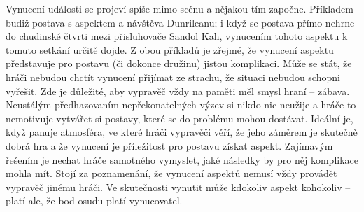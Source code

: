 \documentclass[../main.tex]{subfiles}
\begin{document}
Vynucení události se projeví spíše mimo scénu a nějakou tím započne. Příkladem budiž postava s aspektem  a návštěva Dunrileanu; i když se postava přímo nehrne do chudinské čtvrti mezi přisluhovače Sandol Kah, vynucením tohoto aspektu k tomuto setkání určitě dojde.
Z obou příkladů je zřejmé, že vynucení aspektu představuje pro postavu (či dokonce družinu) jistou komplikaci. Může se stát, že hráči nebudou chctít vynucení přijímat ze strachu, že situaci nebudou schopni vyřešit. Zde je důležité, aby vypravěč vždy na paměti měl smysl hraní – zábava. Neustálým předhazovaním nepřekonatelných výzev si nikdo nic neužije a hráče to nemotivuje vytvářet si postavy, které se do problému mohou dostávat. Ideální je, když panuje atmosféra, ve které hráči vypravěči věří, že jeho záměrem je skutečně dobrá hra a že vynucení je příležitost pro postavu získat aspekt. Zajímavým řešením je nechat hráče samotného vymyslet, jaké následky by pro něj komplikace mohla mít.
Stojí za poznamenání, že vynucení aspektů nemusí vždy provádět vypravěč jinému hráči. Ve skutečnosti vynutit může kdokoliv aspekt kohokoliv – platí ale, že bod osudu platí vynucovatel. %

\newpage{}
\end{document}
